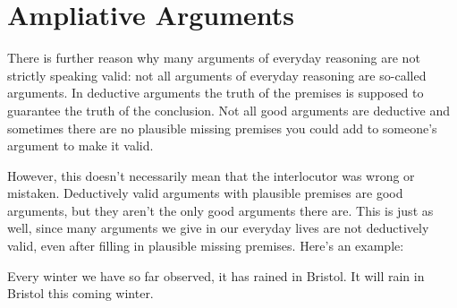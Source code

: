 \section{Ampliative Arguments}
%
%
%
%
%
%
%
%
%
%
%
%
%
%





There is further reason why many arguments of everyday reasoning are not strictly speaking valid: not all arguments of everyday reasoning are so-called  arguments. In deductive arguments the truth of the premises is supposed to guarantee the truth of the conclusion. Not all good arguments are deductive and sometimes there are no plausible missing premises you could add to someone's argument to make it valid.

However, this doesn't necessarily mean that the interlocutor was wrong or mistaken.
Deductively valid arguments with plausible premises are good arguments, but they aren't the only good arguments there are. This is just as well, since many arguments we give in our everyday lives are not deductively valid, even after filling in plausible missing premises. Here's an example:
\begin{earg}
	\prem Every winter we have so far observed, it has rained in Bristol.
	\conc It will rain in Bristol this coming winter. 
\end{earg}

